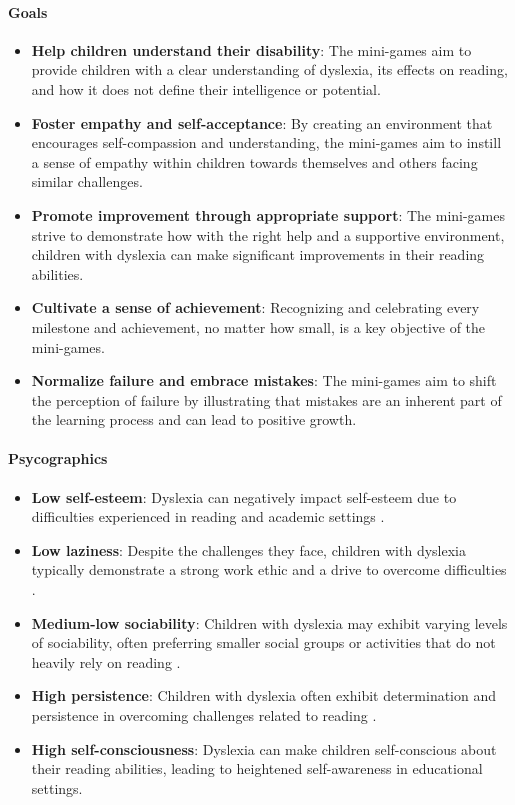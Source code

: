 \paragraph{\textbf{Goals}}
\begin{itemize}
    \item \textbf{Help children understand their disability}: The mini-games aim to provide children with a clear understanding of dyslexia, its effects on reading, and how it does not define their intelligence or potential.
    \item \textbf{Foster empathy and self-acceptance}: By creating an environment that encourages self-compassion and understanding, the mini-games aim to instill a sense of empathy within children towards themselves and others facing similar challenges.
    \item \textbf{Promote improvement through appropriate support}: The mini-games strive to demonstrate how with the right help and a supportive environment, children with dyslexia can make significant improvements in their reading abilities.
    \item \textbf{Cultivate a sense of achievement}: Recognizing and celebrating every milestone and achievement, no matter how small, is a key objective of the mini-games.
    \item \textbf{Normalize failure and embrace mistakes}: The mini-games aim to shift the perception of failure by illustrating that mistakes are an inherent part of the learning process and can lead to positive growth.
\end{itemize}

\paragraph{\textbf{Psycographics}}
\begin{itemize}
    \item \textbf{Low self-esteem}: Dyslexia can negatively impact self-esteem due to difficulties experienced in reading and academic settings \cite{dyslexiaUnderstanding}.
    \item \textbf{Low laziness}: Despite the challenges they face, children with dyslexia typically demonstrate a strong work ethic and a drive to overcome difficulties \cite{dyslexiaStatistics}.
    \item \textbf{Medium-low sociability}: Children with dyslexia may exhibit varying levels of sociability, often preferring smaller social groups or activities that do not heavily rely on reading \cite{dyslexiaClinic}.
    \item \textbf{High persistence}: Children with dyslexia often exhibit determination and persistence in overcoming challenges related to reading \cite{dyslexiaStatistics}.
    \item \textbf{High self-consciousness}: Dyslexia can make children self-conscious about their reading abilities, leading to heightened self-awareness in educational settings.
\end{itemize}

